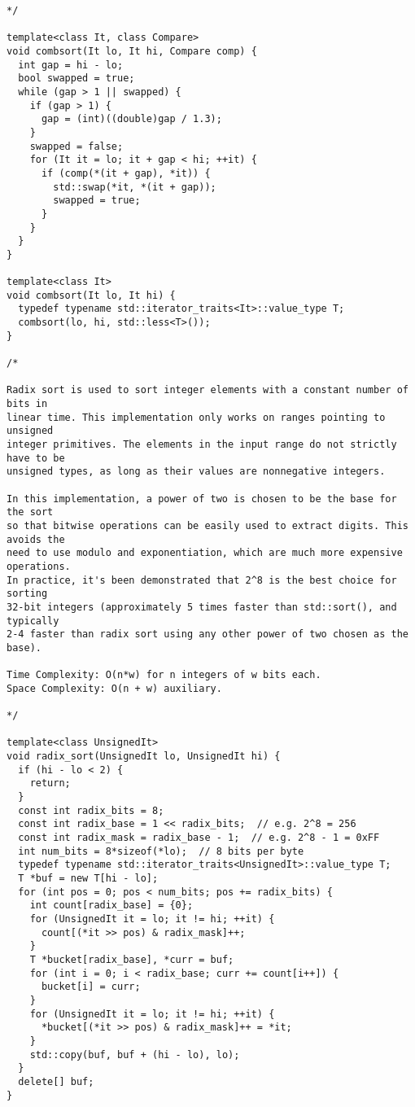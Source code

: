 \begin{lstlisting}
*/

template<class It, class Compare>
void combsort(It lo, It hi, Compare comp) {
  int gap = hi - lo;
  bool swapped = true;
  while (gap > 1 || swapped) {
    if (gap > 1) {
      gap = (int)((double)gap / 1.3);
    }
    swapped = false;
    for (It it = lo; it + gap < hi; ++it) {
      if (comp(*(it + gap), *it)) {
        std::swap(*it, *(it + gap));
        swapped = true;
      }
    }
  }
}

template<class It>
void combsort(It lo, It hi) {
  typedef typename std::iterator_traits<It>::value_type T;
  combsort(lo, hi, std::less<T>());
}

/*

Radix sort is used to sort integer elements with a constant number of bits in
linear time. This implementation only works on ranges pointing to unsigned
integer primitives. The elements in the input range do not strictly have to be
unsigned types, as long as their values are nonnegative integers.

In this implementation, a power of two is chosen to be the base for the sort
so that bitwise operations can be easily used to extract digits. This avoids the
need to use modulo and exponentiation, which are much more expensive operations.
In practice, it's been demonstrated that 2^8 is the best choice for sorting
32-bit integers (approximately 5 times faster than std::sort(), and typically
2-4 faster than radix sort using any other power of two chosen as the base).

Time Complexity: O(n*w) for n integers of w bits each.
Space Complexity: O(n + w) auxiliary.

*/

template<class UnsignedIt>
void radix_sort(UnsignedIt lo, UnsignedIt hi) {
  if (hi - lo < 2) {
    return;
  }
  const int radix_bits = 8;
  const int radix_base = 1 << radix_bits;  // e.g. 2^8 = 256
  const int radix_mask = radix_base - 1;  // e.g. 2^8 - 1 = 0xFF
  int num_bits = 8*sizeof(*lo);  // 8 bits per byte
  typedef typename std::iterator_traits<UnsignedIt>::value_type T;
  T *buf = new T[hi - lo];
  for (int pos = 0; pos < num_bits; pos += radix_bits) {
    int count[radix_base] = {0};
    for (UnsignedIt it = lo; it != hi; ++it) {
      count[(*it >> pos) & radix_mask]++;
    }
    T *bucket[radix_base], *curr = buf;
    for (int i = 0; i < radix_base; curr += count[i++]) {
      bucket[i] = curr;
    }
    for (UnsignedIt it = lo; it != hi; ++it) {
      *bucket[(*it >> pos) & radix_mask]++ = *it;
    }
    std::copy(buf, buf + (hi - lo), lo);
  }
  delete[] buf;
}


\end{lstlisting}
